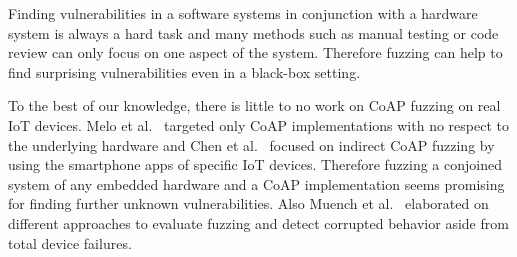 Finding vulnerabilities in a software systems in conjunction with a hardware system is always a hard task and many methods such as manual testing or code review can only focus on one aspect of the system. Therefore fuzzing can help to find surprising vulnerabilities even in a black-box setting.


To the best of our knowledge, there is little to no work on CoAP fuzzing on real IoT devices. Melo et al.~\cite{Melo2017RobustnessTO} targeted only CoAP implementations with no respect to the underlying hardware and Chen et al.~\cite{chen2018ndss} focused on indirect CoAP fuzzing by using the smartphone apps of specific IoT devices. Therefore fuzzing a conjoined system of any embedded hardware and a CoAP implementation seems promising for finding further unknown vulnerabilities. Also Muench et al.~\cite{EURECOM+5417} elaborated on different approaches to evaluate fuzzing and detect corrupted behavior aside from total device failures.